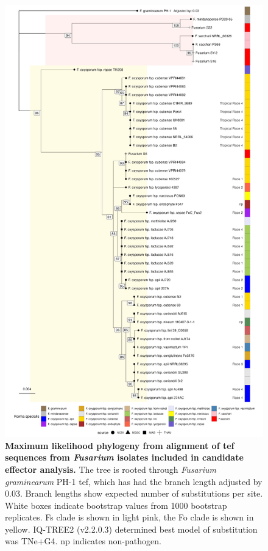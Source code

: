 \begin{figure}[hp!]
    \centering
    \includegraphics[width=12cm]{Figures/BasicTEFPhylo.png}
    \captionsetup{width=\textwidth}
    \caption[Maximum likelihood phylogeny from alignment of \Acl{tef} sequences from \textit{Fusarium} isolates included in candidate effector analysis.]{\textbf{Maximum likelihood phylogeny from alignment of \Acf{tef} sequences from \textit{Fusarium} isolates included in candidate effector analysis.} The tree is rooted through \textit{Fusarium graminearum} PH-1 \ac{tef}, which has had the branch length adjusted by 0.03. Branch lengths show expected number of substitutions per site. White boxes indicate bootstrap values from 1000 bootstrap replicates. \acl{Fs} clade is shown in light pink, the \ac{Fo} clade is shown in yellow. IQ-TREE2 (v2.2.0.3) determined best model of substitution  was TNe+G4. np indicates non-pathogen.}
    \label{fig:TEF1aPhyloaMaei}
\end{figure}

